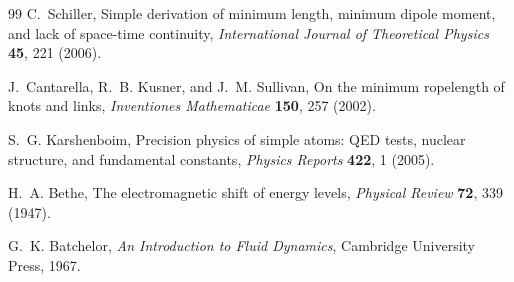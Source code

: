 \documentclass[aps,pra,preprint,longbibliography,nofootinbib]{revtex4-2}
\begin{document}
\begin{thebibliography}{99}
C.~Schiller,
Simple derivation of minimum length, minimum dipole moment, and
lack of space-time continuity,
\textit{International Journal of Theoretical Physics} \textbf{45},
221 (2006).

J.~Cantarella, R.~B. Kusner, and J.~M. Sullivan,
On the minimum ropelength of knots and links,
\textit{Inventiones Mathematicae} \textbf{150}, 257 (2002).

S.~G. Karshenboim,
Precision physics of simple atoms: QED tests, nuclear structure, and
fundamental constants,
\textit{Physics Reports} \textbf{422}, 1 (2005).

H.~A. Bethe,
The electromagnetic shift of energy levels,
\textit{Physical Review} \textbf{72}, 339 (1947).

G.~K. Batchelor,
\textit{An Introduction to Fluid Dynamics},
Cambridge University Press, 1967.

\end{thebibliography}
\end{document}
